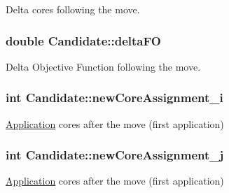 Delta cores following the move. 

\hypertarget{classCandidate_a1bfc07aae3b3914bba57e057936399e7}{
\subsubsection[{delta\-F\-O}]{\setlength{\rightskip}{0pt plus 5cm}double Candidate\-::delta\-F\-O}}\label{classCandidate_a1bfc07aae3b3914bba57e057936399e7}


Delta Objective Function following the move. 

\hypertarget{classCandidate_a859313416296683b7c0496d842dab48a}{
\subsubsection[{new\-Core\-Assignment\-\_\-i}]{\setlength{\rightskip}{0pt plus 5cm}int Candidate\-::new\-Core\-Assignment\-\_\-i}}\label{classCandidate_a859313416296683b7c0496d842dab48a}


\hyperlink{classApplication}{Application} cores after the move (first application) 

\hypertarget{classCandidate_a1203966358bd849169b5f967de3c2bf7}{
\subsubsection[{new\-Core\-Assignment\-\_\-j}]{\setlength{\rightskip}{0pt plus 5cm}int Candidate\-::new\-Core\-Assignment\-\_\-j}}\label{classCandidate_a1203966358bd849169b5f967de3c2bf7}


\hyperlink{classApplication}{Application} cores after the move (first application) 

